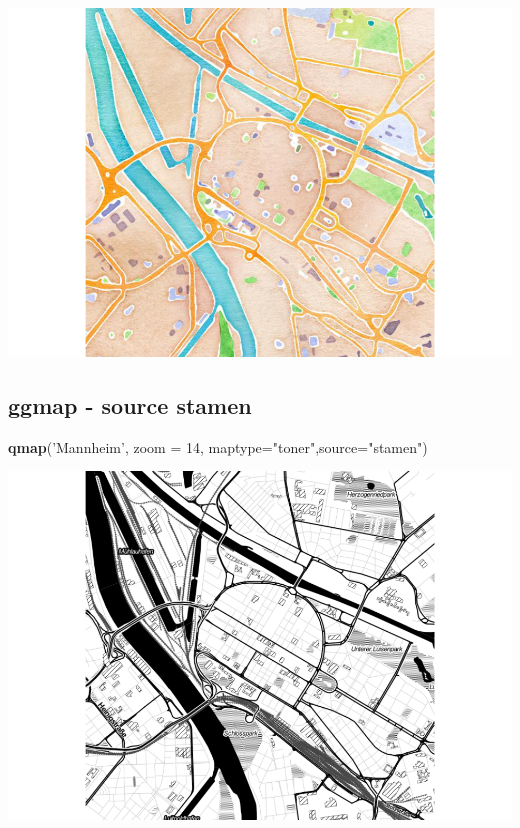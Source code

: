 \documentclass[]{article}
\newenvironment{Shaded}{\begin{snugshade}}{\end{snugshade}}
\newcommand{\KeywordTok}[1]{\textcolor[rgb]{0.13,0.29,0.53}{\textbf{{#1}}}}
\newcommand{\DataTypeTok}[1]{\textcolor[rgb]{0.13,0.29,0.53}{{#1}}}
\newcommand{\DecValTok}[1]{\textcolor[rgb]{0.00,0.00,0.81}{{#1}}}
\newcommand{\StringTok}[1]{\textcolor[rgb]{0.31,0.60,0.02}{{#1}}}
\newcommand{\NormalTok}[1]{{#1}}
\begin{document}
\includegraphics{Intro_Datenanalyse1_files/figure-latex/unnamed-chunk-252-1.pdf}

\subsection{ggmap - source stamen}\label{ggmap---source-stamen}

\begin{Shaded}
\begin{Highlighting}[]
\KeywordTok{qmap}\NormalTok{(}\StringTok{'Mannheim'}\NormalTok{, }\DataTypeTok{zoom =} \DecValTok{14}\NormalTok{,}
 \DataTypeTok{maptype=}\StringTok{"toner"}\NormalTok{,}\DataTypeTok{source=}\StringTok{"stamen"}\NormalTok{)}
\end{Highlighting}
\end{Shaded}

\includegraphics{Intro_Datenanalyse1_files/figure-latex/unnamed-chunk-253-1.pdf}
\end{document}
